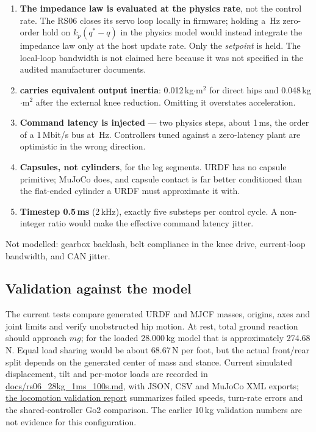 \documentclass[11pt,a4paper]{article}
\begin{document}
\begin{enumerate}
\item \textbf{The impedance law is evaluated at the physics rate}, not the
      control rate. The RS06 closes its servo loop locally in firmware; holding
      a \RdControlRate\,Hz zero-order hold on $k_p(q^*-q)$ in the physics model
      would instead integrate the impedance law only at the host update rate.
      Only the \emph{setpoint} is held. The local-loop bandwidth is not claimed
      here because it was not specified in the audited manufacturer documents.
\item \textbf{ carries equivalent output inertia}:
      0.012\,kg$\cdot$m$^2$ for direct hips and 0.048\,kg$\cdot$m$^2$
      after the external knee reduction. Omitting it overstates acceleration.
\item \textbf{Command latency is injected} --- two physics steps, about 1\,ms,
      the order of a 1\,Mbit/s bus at \RdControlRate\,Hz. Controllers tuned
      against a zero-latency plant are optimistic in the wrong direction.
\item \textbf{Capsules, not cylinders}, for the leg segments. URDF has no
      capsule primitive; MuJoCo does, and capsule contact is far better
      conditioned than the flat-ended cylinder a URDF must approximate it with.
\item \textbf{Timestep 0.5\,ms} (2\,kHz), exactly five substeps per control
      cycle. A non-integer ratio would make the effective command latency jitter.
\end{enumerate}

Not modelled: gearbox backlash, belt compliance in the knee drive, current-loop
bandwidth, and CAN jitter.

\subsection{Validation against the model}

The current tests compare generated URDF and MJCF masses, origins, axes and
joint limits and verify unobstructed hip motion. At rest, total ground reaction
should approach $m g$; for the loaded 28.000\,kg model that is approximately
274.68\,N. Equal load sharing would be about 68.67\,N per foot, but the
actual front/rear split depends on the generated center of mass and stance.
Current simulated displacement, tilt and per-motor loads are recorded in
\href{rs06_28kg_1ms_100s.md}{docs/rs06\_28kg\_1ms\_100s.md}, with JSON, CSV and
MuJoCo XML exports;
\href{locomotion_validation.md}{the locomotion validation report} summarizes
failed speeds, turn-rate errors and the shared-controller Go2 comparison.
The earlier 10\,kg validation numbers are not evidence for this configuration.
\end{document}
